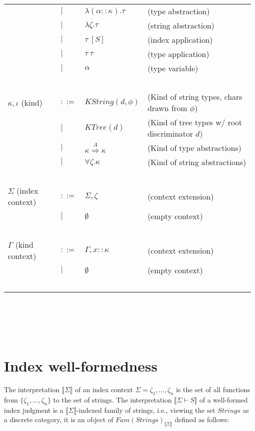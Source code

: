 \documentclass{article}
\newcommand{\sem}[1]{\llbracket #1 \rrbracket}
\begin{document}
\begin{tabular}{llll}
       & $\mid$ & $\lambda (\alpha :: \kappa). \tau$ & (type abstraction) \\
       & $\mid$ & $\lambda \zeta. \tau$ & (string abstraction) \\
       & $\mid$ & $\tau~[S]$ & (index application) \\
       & $\mid$ & $\tau~\tau$ & (type application) \\
       & $\mid$ & $\alpha$ & (type variable) \\~\\
$\kappa, \iota$ (kind) & $::=$ & $\mathit{KString}(d,\phi)$ & (Kind of string types, chars drawn from $\phi$) \\
                         & $\mid$ & $\mathit{KTree}(d)$ & (Kind of tree types w/ root discriminator $d$) \\
                         & $\mid$ & $\kappa \overset{A}{\Rightarrow} \kappa$ & (Kind of type abstractions) \\
                         & $\mid$ & $\forall \zeta. \kappa$ & (Kind of string abstractions) \\~\\
$\Sigma$ (index context) & $::=$ & $\Sigma,\zeta$ & (context extension) \\
                         & $\mid$ & $\emptyset$ & (empty context) \\~\\
$\Gamma$ (kind context) & $::=$ & $\Gamma,x :: \kappa$ & (context extension) \\
                           & $\mid$ & $\emptyset$ & (empty context) \\~\\

\end{tabular}\\~\\~\\
\begin{tabular}{llll}

\end{tabular}

\section*{Index well-formedness}

The interpretation $\sem{\Sigma}$ of an index context $\Sigma = \zeta_1, \ldots, \zeta_n$ is the set of all functions from $\{ \zeta_1, \ldots, \zeta_n \}$ to the set of strings. The interpretation $\sem{\Sigma \vdash S}$ of a well-formed index judgment is a $\sem{\Sigma}$-indexed family of strings, i.e., viewing the set $\mathit{Strings}$ as a discrete category, it is an object of $\mathit{Fam}(\mathit{Strings})_{\sem{\Sigma}}$ defined as follows:
\end{document}
